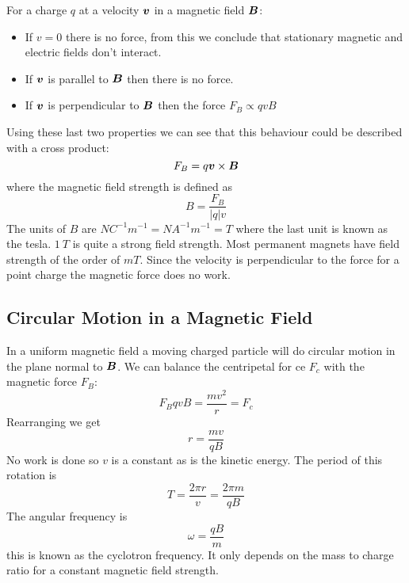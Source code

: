 \documentclass{article}
\begin{document}
    For a charge \(q\) at a velocity \(\bm{v}\) in a magnetic field \(\bm{B}\):
    \begin{itemize}
        \item If \(v = 0\) there is no force, from this we conclude that stationary magnetic and electric fields don't interact.
        \item If \(\bm{v}\) is parallel to \(\bm{B}\) then there is no force.
        \item If \(\bm{v}\) is perpendicular to \(\bm{B}\)  then the force \(F_B\propto qvB\)
    \end{itemize}
    Using these last two properties we can see that this behaviour could be described with a cross product:
    \[F_B = q\bm{v}\times\bm{B}\]
    where the magnetic field strength is defined as
    \[B = \frac{F_B}{|q|v}\]
    The units of \(B\) are \(\si{NC^{-1}m^{-1}} = \si{NA^{-1}m^{-1}} = \si{T}\) where the last unit is known as the tesla.
    \(\SI{1}{T}\) is quite a strong field strength.
    Most permanent magnets have field strength of the order of \(\si{mT}\).
    Since the velocity is perpendicular to the force for a point charge the magnetic force does no work.
    
    \subsection{Circular Motion in a Magnetic Field}
    In a uniform magnetic field a moving charged particle will do circular motion in the plane normal to \(\bm{B}\).
    We can balance the centripetal for ce \(F_c\) with the magnetic force \(F_B\):
    \[F_B qvB = \frac{mv^2}{r} = F_c\]
    Rearranging we get
    \[r = \frac{mv}{qB}\]
    No work is done so \(v\) is a constant as is the kinetic energy.
    The period of this rotation is
    \[T = \frac{2\pi r}{v} = \frac{2\pi m}{qB}\]
    The angular frequency is
    \[\omega = \frac{qB}{m}\]
    this is known as the cyclotron frequency.
    It only depends on the mass to charge ratio for a constant magnetic field strength.
    
\end{document}
